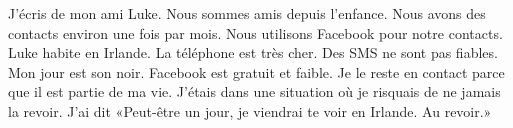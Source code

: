 \documentclass[letterpaper]{article}
\begin{document}
\doublespacing
J'écris de mon ami Luke. Nous sommes amis depuis l'enfance. Nous avons des contacts environ une fois par mois. Nous utilisons Facebook pour notre contacts. Luke habite en Irlande. La téléphone est très cher. Des SMS ne sont pas fiables. Mon jour est son noir. Facebook est gratuit et faible. Je le reste en contact parce que il est partie de ma vie. J'étais dans une situation où  je risquais de ne jamais la revoir. J'ai dit «Peut-être un jour, je viendrai te voir en Irlande. Au revoir.»
\end{document}
